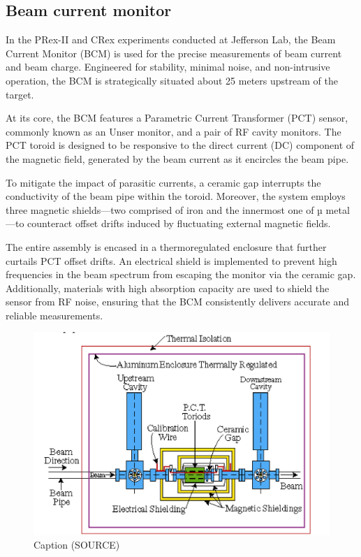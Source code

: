 \subsection{Beam current monitor}

In the PRex-II and CRex experiments conducted at Jefferson Lab, the Beam Current Monitor (BCM) is used for the precise measurements of beam current and beam charge. Engineered for stability, minimal noise, and non-intrusive operation, the BCM is strategically situated about 25 meters upstream of the target.

At its core, the BCM features a Parametric Current Transformer (PCT) sensor, commonly known as an Unser monitor, and a pair of RF cavity monitors. The PCT toroid is designed to be responsive to the direct current (DC) component of the magnetic field, generated by the beam current as it encircles the beam pipe.

To mitigate the impact of parasitic currents, a ceramic gap interrupts the conductivity of the beam pipe within the toroid. Moreover, the system employs three magnetic shields—two comprised of iron and the innermost one of µ metal—to counteract offset drifts induced by fluctuating external magnetic fields.

The entire assembly is encased in a thermoregulated enclosure that further curtails PCT offset drifts. An electrical shield is implemented to prevent high frequencies in the beam spectrum from escaping the monitor via the ceramic gap. Additionally, materials with high absorption capacity are used to shield the sensor from RF noise, ensuring that the BCM consistently delivers accurate and reliable measurements.

\begin{figure}[!htbp]
    \centering
    \includegraphics[width=\textwidth]{images/chap3/beam_current_monitor.png}
    \caption{Caption (SOURCE)}
    \label{fig:enter-label}
\end{figure}


